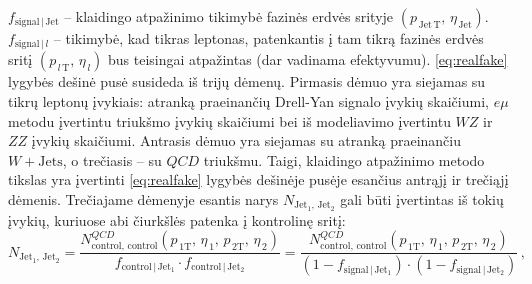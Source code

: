 \documentclass[a4paper, 12pt, oneside]{article}
\newcommand{\ZZ}{Z\! Z}
\newcommand{\WZ}{W\! Z}
\newcommand{\emu}{e\mu}
\newcommand{\WJets}{W\! +\!\mathrm{Jets}}
\newcommand{\QCD}{QC\! D}
\newlength\q
\begin{document}
$f_{\mathrm{signal} \,| \,\mathrm{Jet}}$ -- klaidingo atpažinimo tikimybė fazinės erdvės srityje $(p_{\mathrm{\, Jet \, T}}, \, \eta_{\,\mathrm{Jet}})$. $f_{\mathrm{signal} \,| \,l}$ -- tikimybė, kad tikras leptonas, patenkantis į tam tikrą fazinės erdvės sritį $(p_{\, l\, \mathrm{T}}, \, \eta_{\, l})$ bus
teisingai atpažintas (dar vadinama efektyvumu).
\eqref{eq:realfake} lygybės dešinė pusė susideda iš trijų dėmenų.
Pirmasis dėmuo yra siejamas su tikrų leptonų įvykiais: atranką praeinančių Drell-Yan signalo įvykių skaičiumi, $\emu$ metodu įvertintu
triukšmo įvykių skaičiumi bei iš modeliavimo įvertintu $\WZ$ ir $\ZZ$ įvykių skaičiumi.
Antrasis dėmuo yra siejamas su atranką praeinančiu $\WJets$, o trečiasis -- su $\QCD$ triukšmu.
Taigi, klaidingo atpažinimo metodo tikslas yra įvertinti \eqref{eq:realfake} lygybės dešinėje pusėje esančius antrąjį ir trečiąjį dėmenis.
Trečiajame dėmenyje esantis narys $N_{\mathrm{Jet_1, \, Jet_2}}$ gali būti įvertintas iš tokių įvykių, kuriuose abi čiurkšlės patenka į kontrolinę
sritį:
\begin{equation}
	\label{eq:FRQCD}
	N_{\mathrm{Jet_1, \, Jet_2}} =
	\frac{N^{\QCD}_{\mathrm{control, \, control}}(p_{\,1\mathrm{T}}, \, \eta_{\, 1}, \, p_{\, 2\mathrm{T}}, \, \eta_{\, 2})}
	{f_{\mathrm{control} \,| \,\mathrm{Jet_1}} \cdot
	f_{\mathrm{control} \,| \,\mathrm{Jet_2}}} =
	\frac{N^{\QCD}_{\mathrm{control, \, control}}(p_{\,1\mathrm{T}}, \, \eta_{\, 1}, \, p_{\, 2\mathrm{T}}, \, \eta_{\, 2})}
	{\left(1-f_{\mathrm{signal} \,| \,\mathrm{Jet_1}}\right) \cdot
	\left(1-f_{\mathrm{signal} \,| \,\mathrm{Jet_2}}\right)} \, ,
\end{equation}
\end{document}
